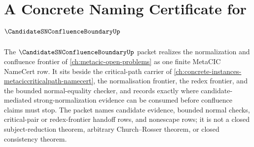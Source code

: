 \chapter{A Concrete Naming Certificate for $\CandidateSNConfluenceBoundaryUp$}
\label{ch:concrete-instances-candidate-sn-confluence-boundary-namecert}

The $\CandidateSNConfluenceBoundaryUp$ packet realizes the normalization and confluence frontier of \autoref{ch:metacic-open-problems} as one finite MetaCIC NameCert row. It sits beside the critical-path carrier of \autoref{ch:concrete-instances-metaciccriticalpath-namecert}, the normalisation frontier, the redex frontier, and the bounded normal-equality checker, and records exactly where candidate-mediated strong-normalization evidence can be consumed before confluence claims must stop. The packet names candidate evidence, bounded normal checks, critical-pair or redex-frontier handoff rows, and nonescape rows; it is not a closed subject-reduction theorem, arbitrary Church--Rosser theorem, or closed consistency theorem.



